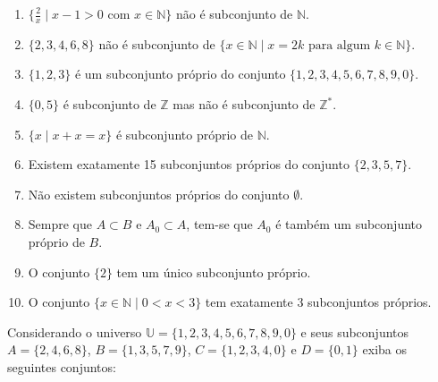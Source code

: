 \begin{enumerate}
	\item $\{\frac{2}{x} \mid x - 1 > 0 \mbox{ com } x \in \mathbb{N}\}$ não é subconjunto de $\mathbb{N}$. 
	\item $\{2, 3, 4, 6, 8\}$ não é subconjunto de $\{x \in \mathbb{N} \mid  x = 2k \mbox{ para algum } k \in \mathbb{N}\}$.
	\item $\{1, 2, 3\}$ é um subconjunto próprio do conjunto $\{1, 2, 3, 4, 5, 6, 7,8,9,0\}$.
	\item $\{0, 5\}$ é subconjunto de $\mathbb{Z}$ mas não é subconjunto de $\mathbb{Z}^*$.
	\item $\{ x \mid x + x = x\}$ é subconjunto próprio de $\mathbb{N}$.
	\item Existem exatamente 15 subconjuntos próprios do conjunto $\{2, 3, 5, 7\}$.
	\item Não existem subconjuntos próprios do conjunto $\emptyset$.
	\item Sempre que $A \subset B$ e $A_0 \subset A$, tem-se que $A_0$ é também um subconjunto próprio de $B$.
	\item O conjunto $\{2\}$ tem um único subconjunto próprio.
	\item O conjunto $\{x \in \mathbb{N} \mid 0 < x < 3\}$ tem exatamente 3 subconjuntos próprios.
\end{enumerate}

\begin{exercise}\label{exerc:Conjuntos8}
	Considerando o universo $\mathbb{U} = \{1, 2, 3, 4, 5, 6, 7, 8, 9, 0\}$ e seus subconjuntos $A = \{2, 4, 6, 8\}$, $B = \{1, 3, 5, 7, 9\}$, $C = \{1, 2, 3, 4, 0\}$ e $D = \{0, 1\}$ exiba os seguintes conjuntos:
\end{exercise}

